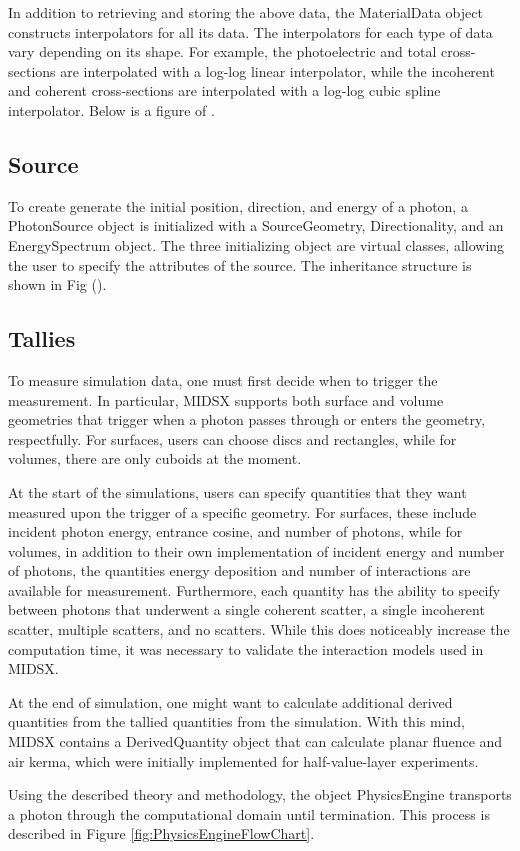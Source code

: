 In addition to retrieving and storing the above data, the MaterialData object constructs interpolators for all its data. The interpolators for each type of data vary depending on its shape. For example, the photoelectric and total cross-sections are interpolated with a log-log linear interpolator, while the incoherent and coherent cross-sections are interpolated with a log-log cubic spline interpolator. Below is a figure of .\\

\subsection{Source}
    To create generate the initial position, direction, and energy of a photon, a PhotonSource object is initialized with a SourceGeometry, Directionality, and an EnergySpectrum object. The three initializing object are virtual classes, allowing the user to specify the attributes of the source. The inheritance structure is shown in Fig (). 


\subsection{Tallies}
\par To measure simulation data, one must first decide when to trigger the measurement. In particular, MIDSX supports both surface and volume geometries that trigger when a photon passes through or enters the geometry, respectfully. For surfaces, users can choose discs and rectangles, while for volumes, there are only cuboids at the moment.
\par At the start of the simulations, users can specify quantities that they want measured upon the trigger of a specific geometry. For surfaces, these include incident photon energy, entrance cosine, and number of photons, while for volumes, in addition to their own implementation of incident energy and number of photons, the quantities energy deposition and number of interactions are available for measurement. Furthermore, each quantity has the ability to specify between photons that underwent a single coherent scatter, a single incoherent scatter, multiple scatters, and no scatters. While this does noticeably increase the computation time, it was necessary to validate the interaction models used in MIDSX.
\par At the end of simulation, one might want to calculate additional derived quantities from the tallied quantities from the simulation. With this mind, MIDSX contains a DerivedQuantity object that can calculate planar fluence and air kerma, which were initially implemented for half-value-layer experiments.
\vspace{1cm}
\par Using the described theory and methodology, the object PhysicsEngine transports a photon through the computational domain until termination. This process is described in Figure \ref{fig:PhysicsEngineFlowChart}.



